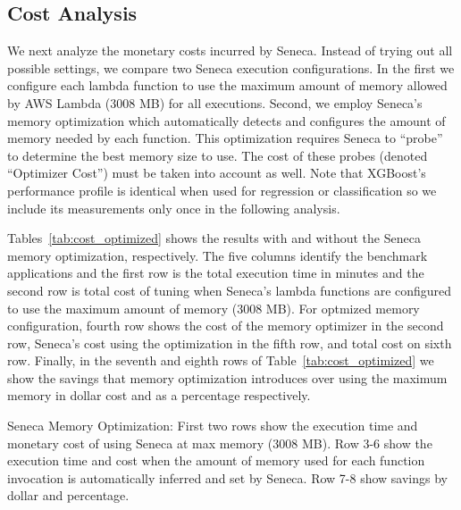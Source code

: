 \subsection{Cost Analysis}



We next analyze the monetary costs incurred by Seneca. Instead of trying out all possible settings,  we compare two
Seneca execution configurations.  In the first 
we configure each lambda function to
use the maximum amount of memory allowed by AWS Lambda (3008 MB) for all
executions.
Second, we employ Seneca's memory optimization which automatically detects and configures
the amount of memory needed by each function.  This optimization requires
Seneca to ``probe'' to determine the best memory size to use.  The
cost of these probes
(denoted ``Optimizer Cost'') must be taken into account as well.
Note that XGBoost's performance profile is identical when used for regression
or classification so we include its measurements only once in the following
analysis.



Tables~\ref{tab:cost_optimized} shows the results with and without 
the Seneca memory optimization, respectively. The five columns identify the benchmark applications and the first row is the total execution time in minutes and the second row is total cost of tuning when Seneca's lambda functions are configured to use the maximum amount of memory (3008 MB). For optmized memory configuration, fourth row shows the cost of the memory optimizer in the
second row, Seneca's cost using the optimization in the fifth row, and total cost on sixth row.
Finally, in the seventh and eighth rows of Table~\ref{tab:cost_optimized} we show the
savings that memory optimization introduces over using the maximum memory in dollar cost and as a percentage respectively.   

\begin{table}
\centering

\caption{Seneca Memory Optimization: First two rows show the execution time and  monetary cost of using Seneca at max memory (3008 MB). Row 3-6 show the execution time and cost when the amount of memory used for each function invocation is automatically inferred and set by Seneca. Row 7-8 show savings by dollar and percentage.
\label{tab:cost_optimized}}
\vspace{-0.2in}
\end{table}

